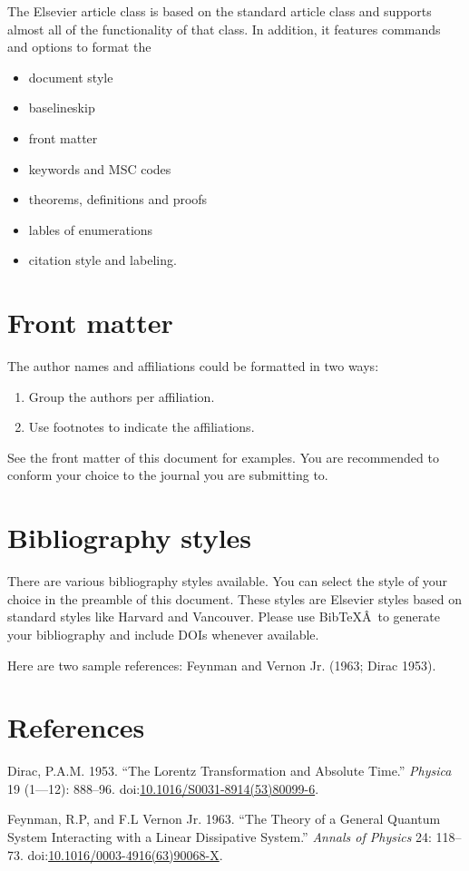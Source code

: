 \documentclass[]{elsarticle} %
\begin{document}
The Elsevier article class is based on the standard article class and
supports almost all of the functionality of that class. In addition, it
features commands and options to format the

\begin{itemize}
\item
  document style
\item
  baselineskip
\item
  front matter
\item
  keywords and MSC codes
\item
  theorems, definitions and proofs
\item
  lables of enumerations
\item
  citation style and labeling.
\end{itemize}

\section{Front matter}\label{front-matter}

The author names and affiliations could be formatted in two ways:

\begin{enumerate}
\def\labelenumi{(\arabic{enumi})}
\item
  Group the authors per affiliation.
\item
  Use footnotes to indicate the affiliations.
\end{enumerate}

See the front matter of this document for examples. You are recommended
to conform your choice to the journal you are submitting to.

\section{Bibliography styles}\label{bibliography-styles}

There are various bibliography styles available. You can select the
style of your choice in the preamble of this document. These styles are
Elsevier styles based on standard styles like Harvard and Vancouver.
Please use BibTeXÂ~to generate your bibliography and include DOIs
whenever available.

Here are two sample references: Feynman and Vernon Jr. (1963; Dirac
1953).

\section*{References}\label{references}

\hypertarget{refs}{}
\hypertarget{ref-Dirac1953888}{}
Dirac, P.A.M. 1953. ``The Lorentz Transformation and Absolute Time.''
\emph{Physica} 19 (1---12): 888--96.
doi:\href{https://doi.org/10.1016/S0031-8914(53)80099-6}{10.1016/S0031-8914(53)80099-6}.

\hypertarget{ref-Feynman1963118}{}
Feynman, R.P, and F.L Vernon Jr. 1963. ``The Theory of a General Quantum
System Interacting with a Linear Dissipative System.'' \emph{Annals of
Physics} 24: 118--73.
doi:\href{https://doi.org/10.1016/0003-4916(63)90068-X}{10.1016/0003-4916(63)90068-X}.
\end{document}
